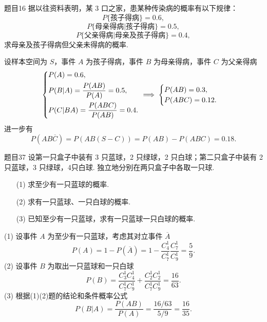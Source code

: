 \begin{question}{题目16}
    据以往资料表明，某 3 口之家，患某种传染病的概率有以下规律：
    $$
        P\{ \text{孩子得病} \} = 0.6,
    $$
    $$
        P\{ \text{母亲得病}|\text{孩子得病} \} = 0.5,
    $$
    $$
        P\{ \text{父亲得病}|\text{母亲及孩子得病} \} = 0.4,
    $$
    求母亲及孩子得病但父亲未得病的概率.
\end{question}
\begin{solution}
    设样本空间为 $S$，事件 $A$ 为孩子得病，事件 $B$ 为母亲得病，事件 $C$ 为父亲得病
    $$
        \begin{dcases}
            P(A) = 0.6,                           \\
            P(B|A) = \frac{P(AB)}{P(A)} = 0.5,    \\
            P(C|BA) = \frac{P(ABC)}{P(AB)} = 0.4. \\
        \end{dcases}
        \implies
        \begin{cases}
            P(AB) = 0.3,    \\
            P(ABC) =  0.12. \\
        \end{cases}
    $$
    进一步有
    $$
        P(AB\overline{C}) = P(AB(S-C)) = P(AB)-P(ABC) = 0.18.
    $$
\end{solution}

\begin{question}{题目37}
    设第一只盒子中装有 3 只蓝球，2 只绿球，2 只白球；第二只盒子中装有 2 只蓝球，3 只绿球，4只白球. 独立地分别在两只盒子中各取一只球.
    \begin{itemize}
        \item [(1)] 求至少有一只蓝球的概率.
        \item [(2)] 求有一只蓝球、一只白球的概率.
        \item [(3)] 已知至少有一只蓝球，求有一只蓝球一只白球的概率.
    \end{itemize}
\end{question}
\begin{solution}
    (1) 设事件 $A$ 为至少有一只蓝球，考虑其对立事件 $\overline{A}$
    $$
        P(A) = 1-P(\overline{A})
        = 1 - \frac{C_4^1}{C_7^1} \frac{C_7^1}{C_9^1}
        = \frac{5}{9}.
    $$
    (2) 设事件 $B$ 为取出一只蓝球和一只白球
    $$
        P(B) = \frac{C_3^1 C_4^1}{C_7^1C_9^1} + \frac{C_2^1C_2^1}{C_7^1C_9^1}
        = \frac{16}{63}.
    $$
    (3) 根据(1)(2)题的结论和条件概率公式
    $$
        P(B|A) = \frac{P(AB)}{P(A)}
        = \frac{16/63}{5/9}
        = \frac{16}{35}.
    $$
\end{solution}